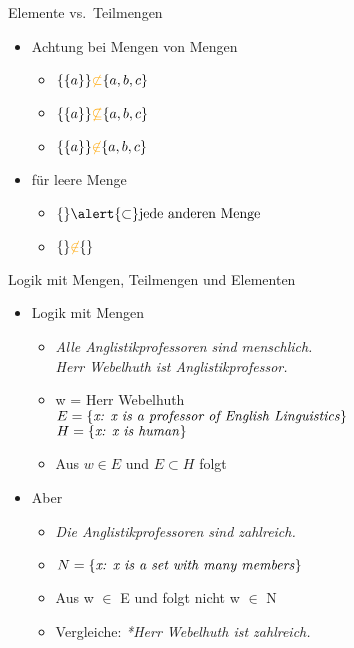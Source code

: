 \begin{frame}
  {Elemente vs.\ Teilmengen}
  \onslide<+->
  \begin{itemize}[<+->]
    \item Achtung bei Mengen von Mengen
      \Viertelzeile
      \begin{itemize}[<+->]
        \item $\{\{a\}\}\orongsch{\not\subset}\{a,b,c\}$
        \item $\{\{a\}\}\orongsch{\not\subseteq}\{a,b,c\}$
        \item $\{\{a\}\}\orongsch{\not\in}\{a,b,c\}$
      \end{itemize}
    \Zeile
    \item für leere Menge 
      \Viertelzeile
      \begin{itemize}[<+->]
        \item $\{\}\alert{\subset}\text{jede anderen Menge}$
        \item $\{\}\orongsch{\not\in}\{\}$
      \end{itemize}
  \end{itemize}
\end{frame}

\begin{frame}
  {Logik mit Mengen, Teilmengen und Elementen}
  \onslide<+->
  \begin{itemize}[<+->]
    \item Logik mit Mengen
        \begin{itemize}[<+->]
        \item \textit{Alle Anglistikprofessoren sind menschlich.}\\
          \textit{Herr Webelhuth ist Anglistikprofessor.}
        \item w = Herr Webelhuth\\
          $E=\{\text{\textit{x: x is a professor of English Linguistics}}\}$\\
          $H=\{\text{\textit{x: x is human}}\}$
        \item Aus \alert{$w\in E$} und \alert{$E\subset H$} folgt 
      \end{itemize}
      \Halbzeile
    \item Aber
      \begin{itemize}[<+->]
        \item \textit{Die Anglistikprofessoren sind zahlreich.}
        \item $N=\{\text{\textit{x: x is a set with many members}}\}$
        \item Aus \alert{w $\in$ E} und  folgt nicht \alert{w $\in$ N}
        \item Vergleiche: \textit{*Herr Webelhuth ist zahlreich.}
      \end{itemize}
  \end{itemize}
\end{frame}

